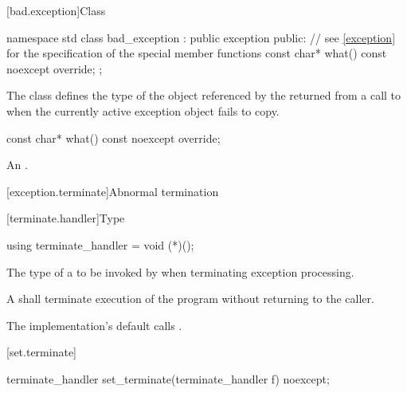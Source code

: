 [bad.exception]{Class }

%
%
\begin{codeblock}
namespace std {
  class bad_exception : public exception {
  public:
    // see \ref{exception} for the specification of the special member functions
    const char* what() const noexcept override;
  };
}
\end{codeblock}

\pnum
The class
defines the type of the object
referenced by the 
returned from a call to 
when the currently active exception object fails to copy.

%
\begin{itemdecl}
const char* what() const noexcept override;
\end{itemdecl}

\begin{itemdescr}
\pnum
\returns
An  \ntbs{}.
\end{itemdescr}

[exception.terminate]{Abnormal termination}

[terminate.handler]{Type }

%
\begin{itemdecl}
using terminate_handler = void (*)();
\end{itemdecl}

\begin{itemdescr}
\pnum
The type of a 
to be invoked by 
%
when terminating exception processing.

\pnum
\required
A  shall
terminate execution of the program without returning to the caller.

\pnum
{}
The implementation's default  calls
.%
%
\end{itemdescr}

[set.terminate]{}

%
\begin{itemdecl}
terminate_handler set_terminate(terminate_handler f) noexcept;
\end{itemdecl}

